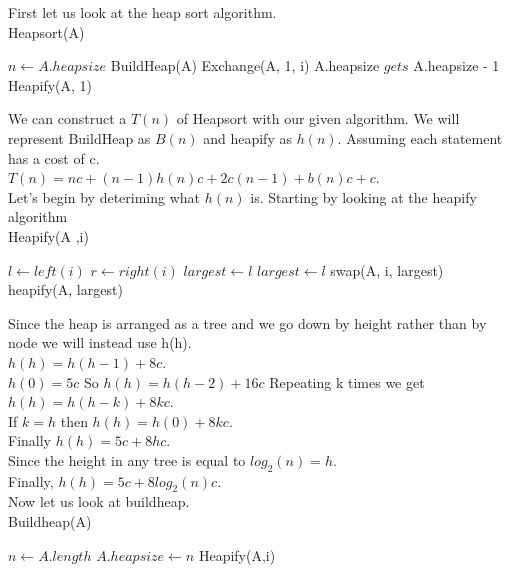 \documentclass{article}
\begin{document}
First let us look at the heap sort algorithm.\\
Heapsort(A)
\begin{algorithmic}[1]
    \State $n \gets A.heapsize$
    \State BuildHeap(A)
        \State Exchange(A, 1, i)
        \State A.heapsize $gets $ A.heapsize - 1
        \State Heapify(A, 1)
\end{algorithmic}

We can construct a $T(n)$ of Heapsort with our given algorithm.
We will represent BuildHeap as $B(n)$ and heapify as $h(n)$.
Assuming each statement has a cost of c.\\

$T(n) = nc + (n-1)h(n)c + 2c(n - 1) + b(n)c + c$.\\

Let's begin by deteriming what $h(n)$ is. Starting by looking at the 
heapify algorithm\\

Heapify(A ,i)
\begin{algorithmic}[1]
    \State $l \gets left(i)$
    \State $r \gets right(i)$
        \state $largest \gets l$
        \state $largest \gets l$
        \state swap(A, i, largest)
        \state heapify(A, largest)
\end{algorithmic}

Since the heap is arranged as a tree and we go down by height 
rather than by node we will instead use h(h).\\
$h(h) = h(h - 1) + 8c$.\\
$h(0) = 5c$
So $h(h) = h(h - 2) + 16c$
Repeating k times we get $h(h) = h(h - k) + 8kc$.\\
If $k = h$ then $h(h) = h(0) + 8kc$.\\
Finally $h(h) = 5c + 8hc$.\\
Since the height in any tree is equal to $log_{2}(n) = h$.\\
Finally, $h(h) = 5c + 8log_{2}(n)c$.\\
Now let us look at buildheap.\\
Buildheap(A)
\begin{algorithmic}[1]
    \State $n \gets A.length$
    \State $A.heapsize \gets n$
        \State Heapify(A,i)
\end{algorithmic}
\end{document}
